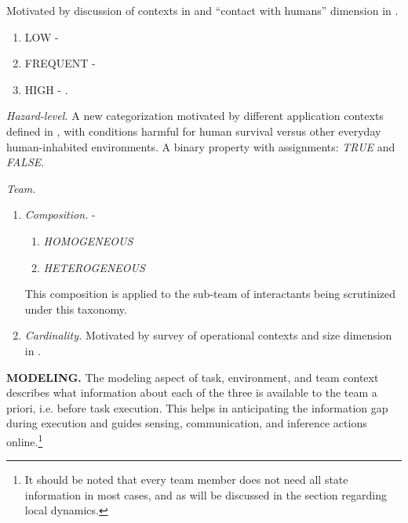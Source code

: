 \documentclass[letterpaper, 10 pt, conference]{ieeeconf}  %
\theoremstyle{definition}
\begin{document}
\begin{enumerate}
\begin{enumerate}
\begin{enumerate}
            Motivated by discussion of contexts in \cite{Burke2004}and ``contact with humans'' dimension in \cite{Dautenhahn}.
            \begin{enumerate}
                \item LOW - \cite{yamada1997human}
                \item FREQUENT - \cite{Casper2003}
                \item HIGH - \cite{Thrun1999Minerva, Burgard1999Mesuem, pacchierotti2006design}.
            \end{enumerate}
            {
            \color{blue}
            \item \textit{Hazard-level.}
            A new categorization motivated by different application contexts defined in \cite{Burke2004}, with conditions harmful for human survival versus other everyday human-inhabited environments.
            A binary property with assignments: \textit{TRUE} and \textit{FALSE}.
            }
        \end{enumerate}
    \item \textit{Team.}
        \begin{enumerate}
            \item \textit{Composition.} \cite{Dudek2002updated, cao1997cooperative} - 
            \begin{enumerate}
                \item \textit{HOMOGENEOUS} \cite{kitano1997robocup}
                \item \textit{HETEROGENEOUS} \cite{Karma2015, fitzgerald2018human}
            \end{enumerate}
            This composition is applied to the sub-team of interactants being scrutinized under this taxonomy.
            \item \textit{Cardinality.}
            Motivated by survey of operational contexts and size dimension in \cite{Dudek2002updated, cao1997cooperative}.
        \end{enumerate}
\end{enumerate}
\item \textbf{MODELING.}
The modeling aspect of task, environment, and team context describes what information about each of the three is available to the team a priori, i.e. before task execution.
This helps in anticipating the information gap during execution and guides sensing, communication, and inference actions online.\footnote{It should be noted that every team member does not need all state information in most cases, and as will be discussed in the section regarding local dynamics.}


\end{enumerate}
\end{document}
